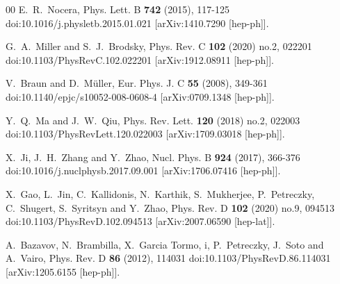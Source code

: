 \documentclass[preprint,12pt]{elsarticle}
\begin{document}
\begin{thebibliography}{00}
E.~R.~Nocera,
Phys. Lett. B \textbf{742} (2015), 117-125
doi:10.1016/j.physletb.2015.01.021
[arXiv:1410.7290 [hep-ph]].

G.~A.~Miller and S.~J.~Brodsky,
Phys. Rev. C \textbf{102} (2020) no.2, 022201
doi:10.1103/PhysRevC.102.022201
[arXiv:1912.08911 [hep-ph]].

V.~Braun and D.~M\"uller,
Eur. Phys. J. C \textbf{55} (2008), 349-361
doi:10.1140/epjc/s10052-008-0608-4
[arXiv:0709.1348 [hep-ph]].

Y.~Q.~Ma and J.~W.~Qiu,
Phys. Rev. Lett. \textbf{120} (2018) no.2, 022003
doi:10.1103/PhysRevLett.120.022003
[arXiv:1709.03018 [hep-ph]].

X.~Ji, J.~H.~Zhang and Y.~Zhao,
Nucl. Phys. B \textbf{924} (2017), 366-376
doi:10.1016/j.nuclphysb.2017.09.001
[arXiv:1706.07416 [hep-ph]].

X.~Gao, L.~Jin, C.~Kallidonis, N.~Karthik, S.~Mukherjee, P.~Petreczky, C.~Shugert, S.~Syritsyn and Y.~Zhao,
Phys. Rev. D \textbf{102} (2020) no.9, 094513
doi:10.1103/PhysRevD.102.094513
[arXiv:2007.06590 [hep-lat]].

A.~Bazavov, N.~Brambilla, X.~Garcia Tormo, i, P.~Petreczky, J.~Soto and A.~Vairo,
Phys. Rev. D \textbf{86} (2012), 114031
doi:10.1103/PhysRevD.86.114031
[arXiv:1205.6155 [hep-ph]].


\end{thebibliography}
\end{document}
